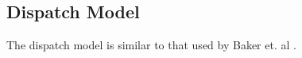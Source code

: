 \subsection{Dispatch Model}

The dispatch model is similar to that used by Baker et. al \cite{baker_optimal_2018}.

